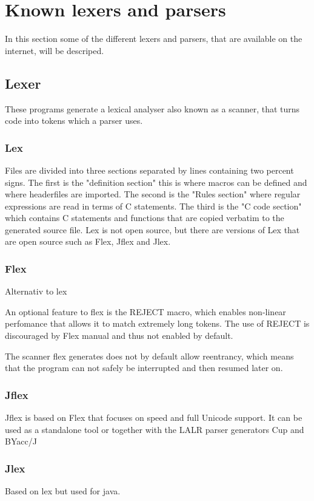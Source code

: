 \section{Known lexers and parsers}
In this section some of the different lexers and parsers, that are available on the internet, will be descriped.

\subsection{Lexer}
These programs generate a lexical analyser also known as a scanner, that turns code into tokens which a parser uses.

\subsubsection{Lex}
Files are divided into three sections separated by lines containing two percent signs. The first is the "definition section" this is where macros can be defined and where headerfiles are imported. The second is the "Rules section" where regular expressions are read in terms of C statements. The third is the "C code section" which contains C statements and functions that are copied verbatim to the generated source file. Lex is not open source, but there are versions of Lex that are open source such as Flex, Jflex and Jlex.

\subsubsection{Flex}
Alternativ to lex

An optional feature to flex is the REJECT macro, which enables non-linear perfomance that allows it to match extremely long tokens. The use of REJECT is discouraged by Flex manual and thus not enabled by default. 

The scanner flex generates does not by default allow reentrancy, which means that the program can not safely be interrupted and then resumed later on.

\subsubsection{Jflex}
Jflex is based on Flex that focuses on speed and full Unicode support. It can be used as a standalone tool or together with the LALR parser generators Cup and BYacc/J

\subsubsection{Jlex}
Based on lex but used for java.

